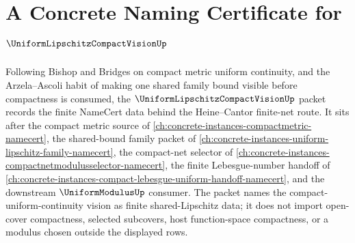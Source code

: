 \chapter{A Concrete Naming Certificate for $\UniformLipschitzCompactVisionUp$}
\label{ch:concrete-instances-uniform-lipschitz-compact-vision-namecert}

Following Bishop and Bridges on compact metric uniform continuity, and the Arzela--Ascoli habit of making one shared family bound visible before compactness is consumed, the $\UniformLipschitzCompactVisionUp$ packet records the finite NameCert data behind the Heine--Cantor finite-net route. It sits after the compact metric source of \autoref{ch:concrete-instances-compactmetric-namecert}, the shared-bound family packet of \autoref{ch:concrete-instances-uniform-lipschitz-family-namecert}, the compact-net selector of \autoref{ch:concrete-instances-compactnetmodulusselector-namecert}, the finite Lebesgue-number handoff of \autoref{ch:concrete-instances-compact-lebesgue-uniform-handoff-namecert}, and the downstream $\UniformModulusUp$ consumer. The packet names the compact-uniform-continuity vision as finite shared-Lipschitz data; it does not import open-cover compactness, selected subcovers, host function-space compactness, or a modulus chosen outside the displayed rows.

